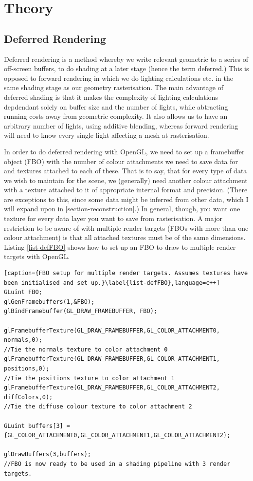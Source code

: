 \chapter{Theory}
\section{Deferred Rendering}\cite{deferred}
Deferred rendering is a method whereby we write relevant geometric to a series of off-screen buffers, to do shading at a later stage (hence the term deferred.) This is opposed to forward rendering in which we do lighting calculations etc. in the same shading stage as our geometry rasterisation. The main advantage of deferred shading is that it makes the complexity of lighting calculations depdendant solely on buffer size and the number of lights, while abtracting running costs away from geometric complexity. It also allows us to have an arbitrary number of lights, using additive blending, whereas forward rendering will need to know every single light affecting a mesh at rasterisation.

In order to do deferred rendering with OpenGL, we need to set up a framebuffer object (FBO) with the number of colour attachments we need to save data for and textures attached to each of these. That is to say, that for every type of data we wish to maintain for the scene, we (generally) need another colour attachment with a texture attached to it of appropriate internal format and precision. (There are exceptions to this, since some data might be inferred from other data, which I will expand upon in \ref{section-reconstruction}.) In general, though, you want one texture for every data layer you want to save from rasterisation. A major restriction to be aware of with multiple render targets (FBOs with more than one colour attachment) is that all attached textures must be of the same dimensions. Listing \ref{list-defFBO} shows how to set up an FBO to draw to multiple render targets with OpenGL.

\begin{lstlisting}[caption={FBO setup for multiple render targets. Assumes textures have been initialised and set up.}\label{list-defFBO},language=c++]
GLuint FBO;
glGenFramebuffers(1,&FBO);
glBindFramebuffer(GL_DRAW_FRAMEBUFFER, FBO);

glFramebufferTexture(GL_DRAW_FRAMEBUFFER,GL_COLOR_ATTACHMENT0, normals,0);
//Tie the normals texture to color attachment 0
glFramebufferTexture(GL_DRAW_FRAMEBUFFER,GL_COLOR_ATTACHMENT1, positions,0);
//Tie the positions texture to color attachment 1
glFramebufferTexture(GL_DRAW_FRAMEBUFFER,GL_COLOR_ATTACHMENT2, diffColors,0);
//Tie the diffuse colour texture to color attachment 2

GLuint buffers[3] = {GL_COLOR_ATTACHMENT0,GL_COLOR_ATTACHMENT1,GL_COLOR_ATTACHMENT2};

glDrawBuffers(3,buffers);
//FBO is now ready to be used in a shading pipeline with 3 render targets.
\end{lstlisting}

